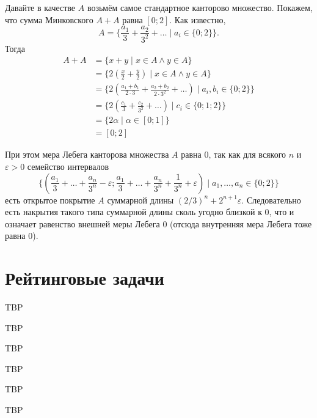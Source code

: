 \documentclass[12pt,a4paper]{article}
\begin{document}
    \begin{enumproblem}
        Давайте в качестве $A$ возьмём самое стандартное канторово множество. Покажем, что сумма Минковского $A + A$ равна $[0; 2]$. Как известно,
        \[A = \{\frac{a_1}{3} + \frac{a_2}{3^2} + \dots \mid a_i \in \{0; 2\}\}.\]
        Тогда
        \begin{align*}
            A + A
            &= \{x + y \mid x \in A \wedge y \in A\}\\
            &= \{2(\frac{x}{2} + \frac{y}{2}) \mid x \in A \wedge y \in A\}\\
            &= \{2(\frac{a_1 + b_1}{2 \cdot 3} + \frac{a_2 + b_2}{2 \cdot 3^2} + \dots) \mid a_i, b_i \in \{0; 2\}\}\\
            &= \{2(\frac{c_1}{3} + \frac{c_2}{3^2} + \dots) \mid c_i \in \{0; 1; 2\}\}\\
            &= \{2\alpha \mid \alpha \in [0; 1]\}\\
            &= [0; 2]
        \end{align*}

        При этом мера Лебега канторова множества $A$ равна $0$, так как для всякого $n$ и $\varepsilon > 0$ семейство интервалов
        \[\{(\frac{a_1}{3} + \dots + \frac{a_n}{3^n} - \varepsilon; \frac{a_1}{3} + \dots + \frac{a_n}{3^n} + \frac{1}{3^n} + \varepsilon) \mid a_1, \dots, a_n \in \{0; 2\}\}\]
        есть открытое покрытие $A$ суммарной длины $(2/3)^n + 2^{n+1}\varepsilon$. Следовательно есть накрытия такого типа суммарной длины сколь угодно близкой к $0$, что и означает равенство внешней меры Лебега $0$ (отсюда внутренняя мера Лебега тоже равна $0$).
    \end{enumproblem}

    \section*{Рейтинговые задачи}

    \begin{enumproblem}
        TBP
    \end{enumproblem}

    \begin{enumproblem}
        TBP
    \end{enumproblem}

    \begin{enumproblem}
        TBP
    \end{enumproblem}

    \begin{enumproblem}
        TBP
    \end{enumproblem}

    \begin{enumproblem}
        TBP
    \end{enumproblem}

    \begin{enumproblem}
        TBP
    \end{enumproblem}
    
\end{document}
